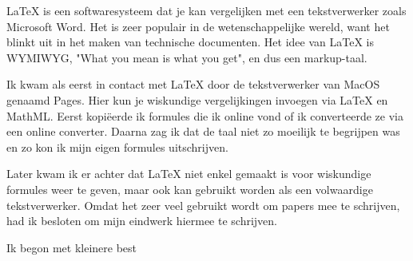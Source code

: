 \LaTeX{} is een softwaresysteem dat je kan vergelijken met een tekstverwerker zoals Microsoft Word. Het is zeer populair in de wetenschappelijke wereld, want het blinkt uit in het maken van technische documenten. Het idee van \LaTeX{} is WYMIWYG, "What you mean is what you get", en dus een markup\hyp{}taal.

Ik kwam als eerst in contact met \LaTeX{} door de tekstverwerker van MacOS genaamd Pages. Hier kun je wiskundige vergelijkingen invoegen via \LaTeX{} en MathML. Eerst kopi\"eerde ik formules die ik online vond of ik converteerde ze via een online converter. Daarna zag ik dat de taal niet zo moeilijk te begrijpen was en zo kon ik mijn eigen formules uitschrijven.

Later kwam ik er achter dat \LaTeX{} niet enkel gemaakt is voor wiskundige formules weer te geven, maar ook kan gebruikt worden als een volwaardige tekstverwerker. Omdat het zeer veel gebruikt wordt om papers mee te schrijven, had ik besloten om mijn eindwerk hiermee te schrijven.

Ik begon met kleinere best